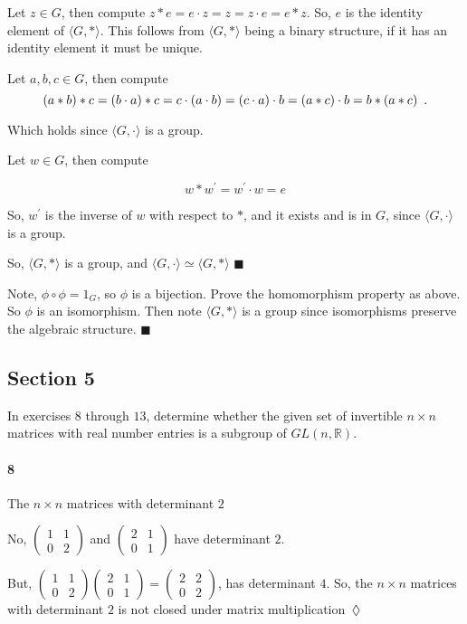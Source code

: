 \documentclass{article}
\newcommand\R{\mathbb{R}}
\begin{document}
Let $z\in G$, then compute $z*e = e\cdot z = z = z\cdot e = e*z$. So,
$e$ is the identity element of $\langle {G,*} \rangle$. This follows
from $\langle {G,*} \rangle$ being a binary structure, if it has an
identity element it must be unique.

Let $a,b,c\in G$, then compute
\[(a*b)*c = (b\cdot a)*c = c\cdot(a\cdot b) = (c\cdot a)\cdot b =
  (a*c)\cdot b = b*(a*c) \enskip.\]

Which holds since $\langle {G,\cdot} \rangle$ is a group.

Let $w\in G$, then compute

\[w*w^\prime = w^\prime \cdot w = e\]

So, $w^\prime$ is the inverse of $w$ with respect to $*$, and it
exists and is in $G$, since $\langle {G,\cdot} \rangle$ is a group.

So, $\langle {G,*} \rangle$ is a group, and $\langle {G,\cdot}
\rangle\simeq \langle {G,*} \rangle$
$\blacksquare$

 Note, $\phi\circ \phi = 1_G$, so $\phi$ is a
bijection. Prove the homomorphism property as above. So $\phi$ is
an isomorphism. Then note $\langle {G,*} \rangle$ is a group since
isomorphisms preserve the algebraic structure. $\blacksquare$

\subsection*{Section 5}

In exercises $8$ through $13$, determine whether the given set of
invertible $n\times n$ matrices with real number entries is a subgroup
of $GL(n,\R).$

\paragraph{8} The $n\times n$ matrices with determinant $2$


No, $\begin{pmatrix}1&1\\ 0&2\end{pmatrix}$ and $\begin{pmatrix}2&1\\
  0&1\end{pmatrix}$ have determinant $2$.

But, $\begin{pmatrix}1&1\\ 0&2\end{pmatrix}\begin{pmatrix}2&1\\
  0&1\end{pmatrix} = \begin{pmatrix}2&2\\
  0&2\end{pmatrix}$, has determinant $4$. So, the $n\times n$ matrices
with determinant $2$ is not closed under matrix multiplication$\enskip
\lozenge$
\end{document}
